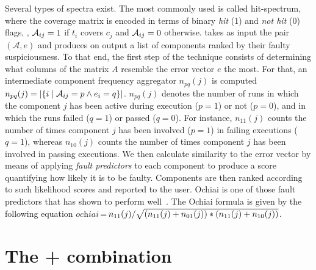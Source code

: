 \documentclass{article}
\begin{document}
Several types of spectra exist.  The most commonly used is called
hit-spectrum, where the coverage matrix is encoded in terms of binary
\emph{hit} (1) and \emph{not hit} (0) flags, \ie{}, $\mathcal{A}_{ij} = 1$ if
$t_i$ covers $c_j$ and $\mathcal{A}_{ij} = 0$ otherwise.  \sfl{} takes as input
the pair $(\mathcal{A},e)$ and produces on output a list of components
ranked by their faulty suspiciousness. To that end, the first step of
the technique consists of determining what columns of the matrix $A$
resemble the error vector $e$ the most.  For that, an intermediate
component frequency aggregator $n_{pq}(j)$ is computed $n_{pq}(j) =
|\{i\mid \mathcal{A}_{ij}=p \wedge e_i=q\}|$. $n_{pq}(j)$ denotes the number of
runs in which the component $j$ has been active during execution ($p =
1$) or not ($p=0$), and in which the runs failed ($q = 1$) or passed
($q = 0$).  For instance, $n_{11}(j)$ counts the number of times
component $j$ has been involved ($p = 1$) in failing executions ($q =
1$), whereas $n_{10}(j)$ counts the number of times component $j$ has
been involved in passing executions. We then calculate similarity to
the error vector by means of applying \emph{fault predictors} to each
component to produce a score quantifying how likely it is to be
faulty.  Components are then ranked according to such likelihood
scores and reported to the user. Ochiai is one of those fault
predictors that has shown to perform
well~\cite{7390282,Pearson:2017:EIF:3097368.3097441}. The Ochiai
formula is given by the following equation
$\textit{ochiai}\,$=$\,n_{11}(j)/\sqrt{(n_{11}(j)+n_{01}(j)) * (n_{11}(j)+n_{10}(j))}$.


\section{The \sfl{}+\cs{} combination}
\label{sec:combination}

  
\end{document}

